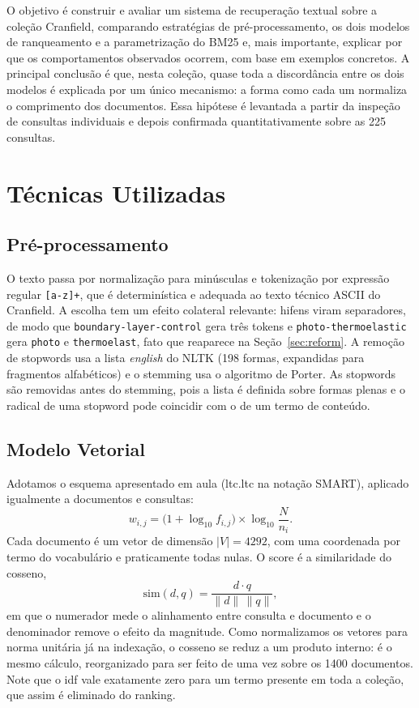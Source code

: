 \documentclass[10pt,twocolumn,a4paper]{article}
\begin{document}
O objetivo é construir e avaliar um sistema de recuperação textual sobre a
coleção Cranfield, comparando estratégias de pré-processamento, os dois modelos
de ranqueamento e a parametrização do BM25 e, mais importante, explicar por que
os comportamentos observados ocorrem, com base em exemplos concretos. A
principal conclusão é que, nesta coleção, quase toda a discordância entre os
dois modelos é explicada por um único mecanismo: a forma como cada um normaliza
o comprimento dos documentos. Essa hipótese é levantada a partir da inspeção de
consultas individuais e depois confirmada quantitativamente sobre as 225
consultas.

\section{Técnicas Utilizadas}

\subsection{Pré-processamento}

O texto passa por normalização para minúsculas e tokenização por expressão
regular \verb|[a-z]+|, que é determinística e adequada ao texto técnico ASCII do
Cranfield. A escolha tem um efeito colateral relevante: hifens viram
separadores, de modo que \texttt{boundary-layer-control} gera três tokens e
\texttt{photo-thermoelastic} gera \texttt{photo} e \texttt{thermoelast}, fato
que reaparece na Seção~\ref{sec:reform}. A remoção de stopwords usa a lista
\textit{english} do NLTK (198 formas, expandidas para fragmentos alfabéticos) e
o stemming usa o algoritmo de Porter. As stopwords são removidas antes do
stemming, pois a lista é definida sobre formas plenas e o radical de uma
stopword pode coincidir com o de um termo de conteúdo.

\subsection{Modelo Vetorial}

Adotamos o esquema apresentado em aula (ltc.ltc na notação SMART), aplicado
igualmente a documentos e consultas:
\[
  w_{i,j} = \bigl(1 + \log_{10} f_{i,j}\bigr) \times \log_{10}\!\frac{N}{n_i}.
\]
Cada documento é um vetor de dimensão $|V| = 4292$, com uma coordenada por termo
do vocabulário e praticamente todas nulas. O score é a similaridade do cosseno,
\[
  \mathrm{sim}(d,q) = \frac{d \cdot q}{\lVert d \rVert \, \lVert q \rVert},
\]
em que o numerador mede o alinhamento entre consulta e documento e o denominador
remove o efeito da magnitude. Como normalizamos os vetores para norma unitária
já na indexação, o cosseno se reduz a um produto interno: é o mesmo cálculo,
reorganizado para ser feito de uma vez sobre os 1400 documentos. Note que o idf
vale exatamente zero para um termo presente em toda a coleção, que assim é
eliminado do ranking.
\end{document}
